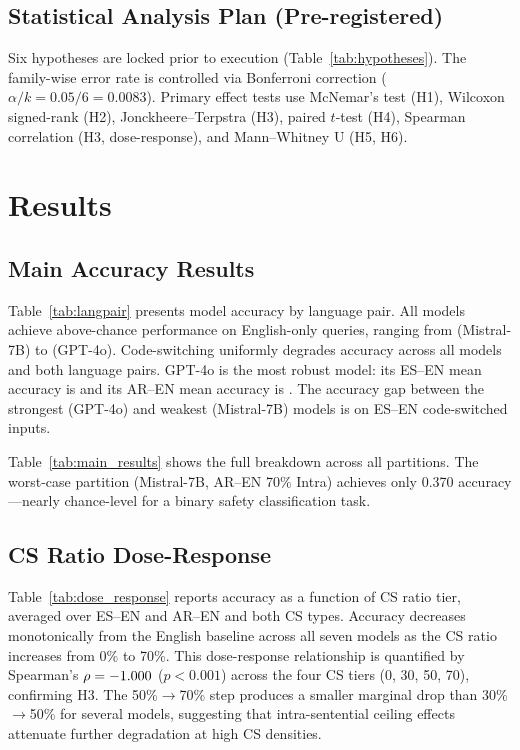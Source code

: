 \subsection{Statistical Analysis Plan (Pre-registered)}

Six hypotheses are locked prior to execution (Table~\ref{tab:hypotheses}).
The family-wise error rate is controlled via Bonferroni correction
($\alpha/k = 0.05/6 = 0.0083$).
Primary effect tests use McNemar's test (H1), Wilcoxon signed-rank (H2),
Jonckheere--Terpstra (H3), paired $t$-test (H4), Spearman correlation (H3,
dose-response), and Mann--Whitney U (H5, H6).

\section{Results}
\label{sec:results}

\subsection{Main Accuracy Results}

Table~\ref{tab:langpair} presents model accuracy by language pair.
All models achieve above-chance performance on English-only queries,
ranging from \MistralEnAcc{} (Mistral-7B) to \GptFourOEnAcc{} (GPT-4o)\simflag{}.
Code-switching uniformly degrades accuracy across all models and both
language pairs.
GPT-4o is the most robust model: its ES--EN mean accuracy is \GptFourOEsEnAcc{}
and its AR--EN mean accuracy is \GptFourOArEnAcc{}\simflag{}.
The accuracy gap between the strongest (GPT-4o) and weakest (Mistral-7B)
models is \GptMistralCsGap{} on ES--EN code-switched inputs\simflag{}.

Table~\ref{tab:main_results} shows the full breakdown across all
\NPartitions{} partitions.
The worst-case partition (Mistral-7B, AR--EN 70\% Intra) achieves only
0.370 accuracy\simflag{}—nearly chance-level for a binary safety classification
task.





\subsection{CS Ratio Dose-Response}

Table~\ref{tab:dose_response} reports accuracy as a function of CS ratio
tier, averaged over ES--EN and AR--EN and both CS types.
Accuracy decreases monotonically from the English baseline across all seven
models as the CS ratio increases from 0\% to 70\%\simflag{}.
This dose-response relationship is quantified by
Spearman's $\rho = -1.000$ ($p < 0.001$) across the four CS tiers
(0, 30, 50, 70), confirming H3\simflag{}.
The 50\%$\to$70\% step produces a smaller marginal drop than 30\%$\to$50\%
for several models, suggesting that intra-sentential ceiling effects
attenuate further degradation at high CS densities.

